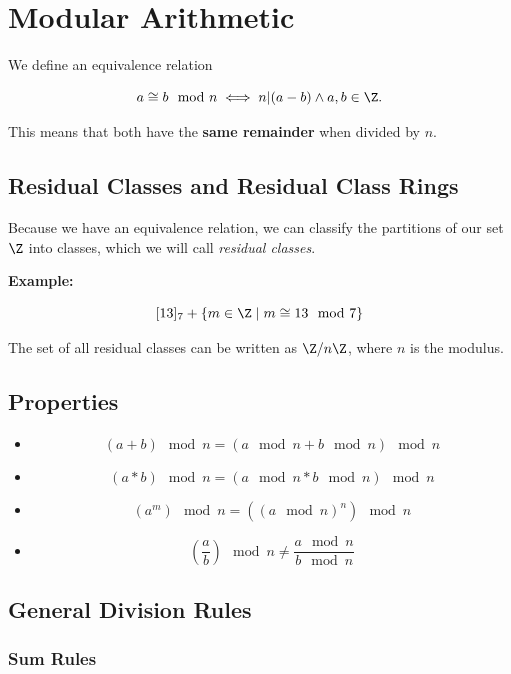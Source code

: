 \chapter{Modular Arithmetic}

We define an equivalence relation 

\[
    a \cong b \mod n \iff n | (a - b) \land  a,b \in \Z.
\]

This means that both have the \textbf{same remainder} when divided by \(n\).

\section{Residual Classes and Residual Class Rings}

Because we have an equivalence relation, we can classify the partitions of our set \(\Z\) into classes, which we will call \emph{residual classes}.

\textbf{Example:}

\[
    [13]_7 + \{m \in \Z \mid m \cong 13 \mod 7\}
\]

The set of all residual classes can be written as \(\Z / n \Z\), where \(n\) is the modulus. 

\section{Properties}

\begin{itemize}
    
    \item  
    \[
        (a + b) \mod n = (a \mod n + b \mod n) \mod n
    \]

    \item 
    \[
        (a * b) \mod n = (a \mod n * b \mod n) \mod n
    \]

    \item 
    \[
        (a^m) \mod n = ({(a \mod n)}^n) \mod n
    \]

    \item 
    \[
        \left(\frac{a}{b}\right) \mod n \ne  \frac{a \mod n}{b \mod n}
    \]

\end{itemize}

\section{General Division Rules}

\subsection*{Sum Rules}

